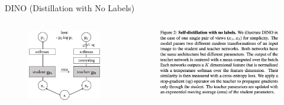 \begin{frame}[allowframebreaks]{DINO (Distillation with No Labels)}
\begin{columns}[b]
        \begin{figure}
            \centering
            \includegraphics[width=\linewidth,height=0.9\textheight,keepaspectratio]{images/contrastive/slide_87_1_img.jpg}
        \end{figure}
        \begin{figure}
            \centering
            \includegraphics[width=\linewidth,height=0.9\textheight,keepaspectratio]{images/contrastive/slide_87_2_img.jpg}
        \end{figure}
\end{columns}


\end{frame}
